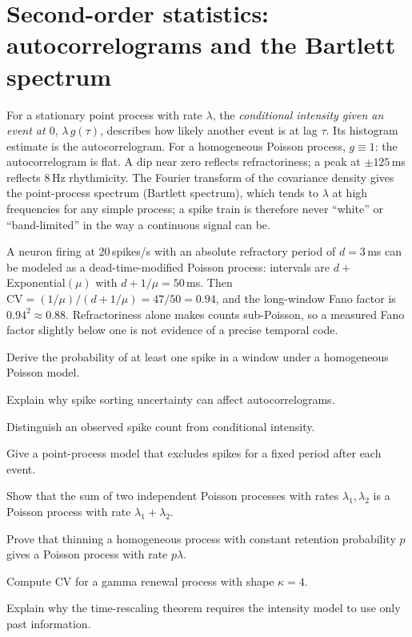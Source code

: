 \section{Second-order statistics: autocorrelograms and the Bartlett spectrum}
For a stationary point process with rate $\lambda$, the \emph{conditional intensity given an event at $0$}, $\lambda\,g(\tau)$, describes how likely another event is at lag $\tau$. Its histogram estimate is the autocorrelogram. For a homogeneous Poisson process, $g\equiv1$: the autocorrelogram is flat. A dip near zero reflects refractoriness; a peak at $\pm125$\,ms reflects 8\,Hz rhythmicity. The Fourier transform of the covariance density gives the point-process spectrum (Bartlett spectrum), which tends to $\lambda$ at high frequencies for any simple process; a spike train is therefore never ``white'' or ``band-limited'' in the way a continuous signal can be.

\begin{workedexample}
A neuron firing at 20\,spikes/s with an absolute refractory period of $d=3$\,ms can be modeled as a dead-time-modified Poisson process: intervals are $d+$Exponential$(\mu)$ with $d+1/\mu=50$\,ms. Then $\mathrm{CV}=(1/\mu)/(d+1/\mu)=47/50=0.94$, and the long-window Fano factor is $0.94^2\approx0.88$. Refractoriness alone makes counts sub-Poisson, so a measured Fano factor slightly below one is not evidence of a precise temporal code.
\end{workedexample}
\begin{exercises}
\item Derive the probability of at least one spike in a window under a homogeneous Poisson model.
\item Explain why spike sorting uncertainty can affect autocorrelograms.
\item Distinguish an observed spike count from conditional intensity.
\item Give a point-process model that excludes spikes for a fixed period after each event.
\item Show that the sum of two independent Poisson processes with rates $\lambda_1,\lambda_2$ is a Poisson process with rate $\lambda_1+\lambda_2$.
\item Prove that thinning a homogeneous process with constant retention probability $p$ gives a Poisson process with rate $p\lambda$.
\item Compute $\mathrm{CV}$ for a gamma renewal process with shape $\kappa=4$.
\item Explain why the time-rescaling theorem requires the intensity model to use only past information.
\end{exercises}
